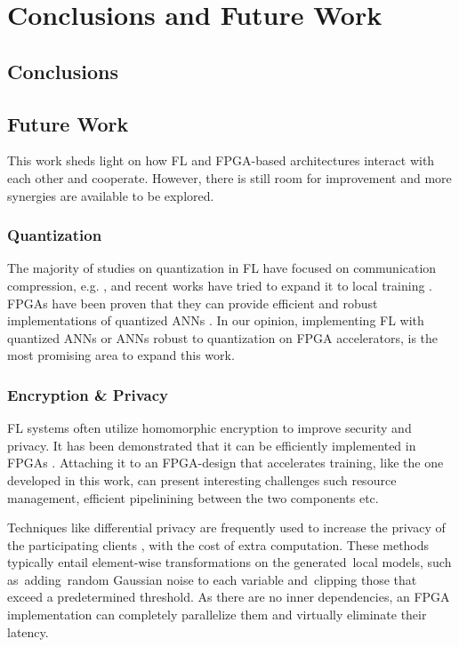 \chapter{Conclusions and Future Work}
\label{Chapter-Conclusions-and-Future-Work}

\section{Conclusions}

\section{Future Work}
This work sheds light on how FL and FPGA-based architectures interact with each other and cooperate. However, there is still room for improvement and more synergies are available to be explored.

\subsection{Quantization}
The majority of studies on quantization in FL have focused on communication compression, e.g. \cite{https://doi.org/10.48550/arxiv.2006.10672}, and recent works have tried to expand it to local training \cite{https://doi.org/10.48550/arxiv.2206.10844}. FPGAs have been proven that they can provide efficient and robust implementations of quantized ANNs \cite{Bacchus2020}. In our opinion, implementing FL with quantized ANNs or ANNs robust to quantization on FPGA accelerators, is the most promising area to expand this work.

\subsection{Encryption \& Privacy}
FL systems often utilize homomorphic encryption to improve security and privacy. It has been demonstrated that it can be efficiently implemented in FPGAs \cite{FPGA_encryption_for_FL}. Attaching it to an FPGA-design that accelerates training, like the one developed in this work, can present interesting challenges such resource management, efficient pipelinining between the two components etc.

Techniques like differential privacy are frequently used to increase the privacy of the participating clients \cite{Wei2020}, with the cost of extra computation. These methods typically entail element-wise transformations on the generated local models, such as adding random Gaussian noise to each variable and clipping those that exceed a predetermined threshold. As there are no inner dependencies, an FPGA implementation can completely parallelize them and virtually eliminate their latency.

